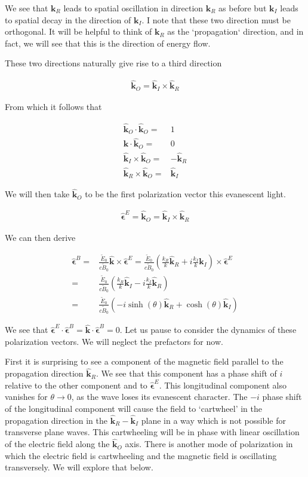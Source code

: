 \documentclass[12pt]{article}
\newcommand{\ep}{\epsilon}
\renewcommand{\vec}[1]{\boldsymbol{#1}}
\newcommand{\unitvec}[1]{\hat{\boldsymbol{#1}}}
\begin{document}
We see that $\vec{k}_R$ leads to spatial oscillation in direction $\vec{k}_R$ as before but $\vec{k}_I$ leads to spatial decay in the direction of $\vec{k}_I$.
I note that these two direction must be orthogonal.
It will be helpful to think of $\vec{k}_R$ as the `propagation` direction, and in fact, we will see that this is the direction of energy flow.

These two directions naturally give rise to a third direction

\begin{align}
\unitvec{k}_O = \unitvec{k}_I\times\unitvec{k}_R
\end{align}

From which it follows that

\begin{align}
\unitvec{k}_O \cdot \unitvec{k}_O =&1\\
\vec{k}\cdot\unitvec{k}_O =& 0\\
\unitvec{k}_I\times\unitvec{k}_O =& -\unitvec{k}_R\\
\unitvec{k}_R \times \unitvec{k}_O =& \unitvec{k}_I
\end{align}

We will then take $\unitvec{k}_O$ to be the first polarization vector this evanescent light.

\begin{align}
\unitvec{\ep}^E = \unitvec{k}_O = \unitvec{k}_I\times\unitvec{k}_R
\end{align}

We can then derive 

\begin{align}
\unitvec{\ep}^B =& \frac{\tilde{E}_0}{c\tilde{B}_0} \unitvec{k}\times \unitvec{\ep}^E = \frac{\tilde{E}_0}{c\tilde{B}_0}\left(\frac{k_R}{k}\unitvec{k}_R + i\frac{k_I}{k}\vec{k}_I\right)\times \unitvec{\ep}^E\\
=& \frac{\tilde{E}_0}{c\tilde{B}_0}\left(\frac{k_R}{k} \unitvec{k}_I - i \frac{k_I}{k}\unitvec{k}_R\right)\\
=& \frac{\tilde{E}_0}{c\tilde{B}_0}\left(- i \sinh(\theta)\unitvec{k}_R + \cosh(\theta) \unitvec{k}_I \right)
\end{align}

We see that $\unitvec{\ep}^E\cdot\unitvec{\ep}^B = \unitvec{k}\cdot\unitvec{\ep}^B=0$.
Let us pause to consider the dynamics of these polarization vectors.
We will neglect the prefactors for now.

First it is surprising to see a component of the magnetic field parallel to the propagation direction $\unitvec{k}_R$.
We see that this component has a phase shift of $i$ relative to the other component and to $\unitvec{\ep}^E$.
This longitudinal component also vanishes for $\theta\rightarrow 0$, as the wave loses its evanescent character.
The $-i$ phase shift of the longitudinal component will cause the field to `cartwheel' in the propagation direction in the $\unitvec{k}_R-\unitvec{k}_I$ plane in a way which is not possible for transverse plane waves.
This cartwheeling will be in phase with linear oscillation of the electric field along the $\unitvec{k}_O$ axis.
There is another mode of polarization in which the electric field is cartwheeling and the magnetic field is oscillating transversely.
We will explore that below.
\end{document}
